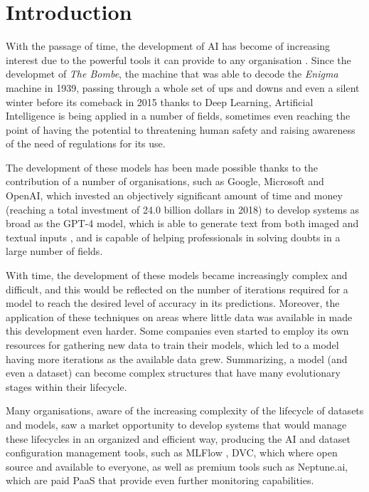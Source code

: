 \chapter{Introduction}
\label{cap:Introduction}

With the passage of time, the development of \acrfull{AI} has become of increasing interest due to the powerful tools it can provide to any
organisation \cite{AIRise}. Since the developmet of \emph{The Bombe}, the machine that was able to decode the \emph{Enigma} machine in 1939,
passing through a whole set of ups and downs and even a silent winter before its comeback in 2015 thanks to Deep Learning, Artificial Intelligence
is being applied in a number of fields, sometimes even reaching the point of having the potential to threatening human safety and raising awareness
of the need of regulations for its use.

The development of these models has been made possible thanks to the contribution of a number of organisations, such as Google, Microsoft and OpenAI,
which invested an objectively significant amount of time and money (reaching a total investment of 24.0 billion dollars in 2018) to develop systems as
broad as the GPT-4 model, which is able to generate text from both imaged and textual inputs \cite{GPT4}, and is capable of helping professionals in solving
doubts in a large number of fields.

With time, the development of these models became increasingly complex and difficult, and this would be reflected on the number of iterations required for
a model to reach the desired level of accuracy in its predictions. Moreover, the application of these techniques on areas where little data was available
in made this development even harder. Some companies even started to employ its own resources for gathering new data to train their models, which led to a model
having more iterations as the available data grew. Summarizing, a model (and even a dataset) can become complex structures that have many evolutionary
stages within their lifecycle.

Many organisations, aware of the increasing complexity of the lifecycle of datasets and models, saw a market opportunity to develop systems that would manage
these lifecycles in an organized and efficient way, producing the AI and dataset configuration management tools, such as MLFlow \cite{MLflow}, DVC, which where
open source and available to everyone, as well as premium tools such as Neptune.ai, which are paid \acrfull{PaaS} that provide even further monitoring
capabilities.

